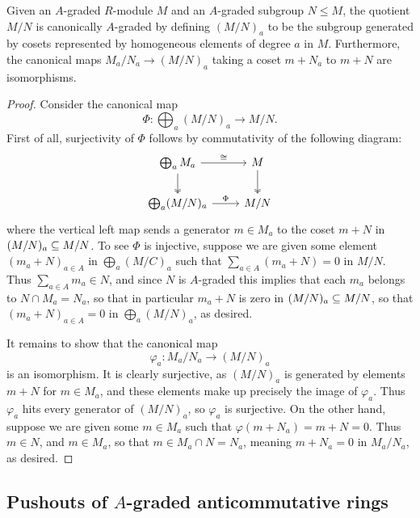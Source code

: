 \documentclass[../main.tex]{subfiles}
\begin{document}
\begin{proposition}\label{quotient_of_A_graded_is_A_graded}
	Given an $A$-graded $R$-module $M$ and an $A$-graded subgroup $N\leq M$, the quotient $M/N$ is canonically $A$-graded by defining $(M/N)_a$ to be the subgroup generated by cosets represented by homogeneous elements of degree $a$ in $M$. Furthermore, the canonical maps $M_a/N_a\to (M/N)_a$ taking a coset $m+N_a$ to $m+N$ are isomorphisms.
\end{proposition}
\begin{proof}
	Consider the canonical map
	\[\Phi:\bigoplus_a (M/N)_a\to M/N.\]
	First of all, surjectivity of $\Phi$ follows by commutativity of the following diagram:
	\[\begin{tikzcd}
		{\bigoplus_a M_a} & M \\
		{\bigoplus_a(M/N)_a} & {M/N}
		\arrow["\cong", from=1-1, to=1-2]
		\arrow[two heads, from=1-2, to=2-2]
		\arrow[two heads, from=1-1, to=2-1]
		\arrow["\Phi", from=2-1, to=2-2]
	\end{tikzcd}\]
	where the vertical left map sends a generator $m\in M_a$ to the coset $m+N$ in $(M/N)_a\subseteq M/N$. To see $\Phi$ is injective, suppose we are given some element $(m_a+N)_{a\in A}$ in $\bigoplus_a(M/C)_a$ such that $\sum_{a\in A}(m_a+N)=0$ in $M/N$. Thus $\sum_{a\in A}m_a\in N$, and since $N$ is $A$-graded this implies that each $m_a$ belongs to $N\cap M_a=N_a$, so that in particular $m_a+N$ is zero in $(M/N)_a\subseteq M/N$, so that $(m_a+N)_{a\in A}=0$ in $\bigoplus_{a}(M/N)_a$, as desired.

	It remains to show that the canonical map
	\[\varphi_a:M_a/N_a\to (M/N)_a\]
	is an isomorphism. It is clearly surjective, as $(M/N)_a$ is generated by elements $m+N$ for $m\in M_a$, and these elements make up precisely the image of $\varphi_a$. Thus $\varphi_a$ hits every generator of $(M/N)_a$, so $\varphi_a$ is surjective. On the other hand, suppose we are given some $m\in M_a$ such that $\varphi(m+N_a)=m+N=0$. Thus $m\in N$, and $m\in M_a$, so that $m\in M_a\cap N=N_a$, meaning $m+N_a=0$ in $M_a/N_a$, as desired.
\end{proof}

\subsection{Pushouts of \texorpdfstring{$A$}{A}-graded anticommutative rings}\label{subsection:A-graded_anticommutative_rings_properties}
\end{document}
